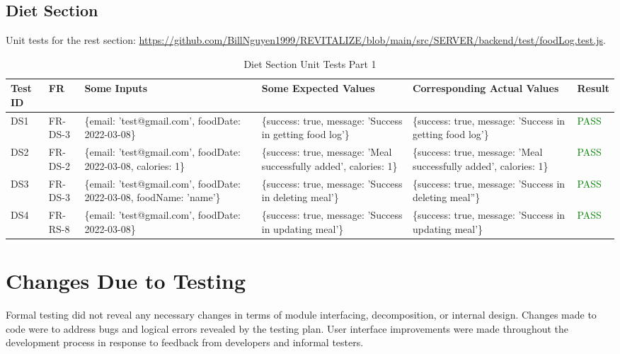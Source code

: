 \documentclass[12pt, titlepage]{article}
\begin{document}
\newpage

\subsection{Diet Section}

Unit tests for the rest section: \url{https://github.com/BillNguyen1999/REVITALIZE/blob/main/src/SERVER/backend/test/foodLog.test.js}.

\begin{table}[h]
\centering
\small
\begin{tabularx}{\textwidth}{|X|X|p{3cm}|p{2.5cm}|p{2.5cm}|X|}
	\hline
	Test ID & FR & Some Inputs & Some Expected Values & Corresponding Actual Values & Result \\
	\hline
	DS1 & FR-DS-3 & \{email: 'test@gmail.com', foodDate: 2022-03-08\}  & \{success: true, message: 'Success in getting food log'\} & \{success: true, message: 'Success in getting food log'\} & \textcolor{Green}{PASS} \\
	\hline
	DS2 & FR-DS-2 & \{email: 'test@gmail.com', foodDate: 2022-03-08, calories: 1\}  & \{success: true, message: 'Meal successfully added', calories: 1\} & \{success: true, message: 'Meal successfully added', calories: 1\} & \textcolor{Green}{PASS} \\
	\hline
	DS3 & FR-DS-3 & \{email: 'test@gmail.com', foodDate: 2022-03-08, foodName: 'name'\}  & \{success: true, message: 'Success in deleting meal'\} & \{success: true, message: 'Success in deleting meal''\} & \textcolor{Green}{PASS} \\
	\hline
	DS4 & FR-RS-8 & \{email: 'test@gmail.com', foodDate: 2022-03-08\}  & \{success: true, message: 'Success in updating meal'\} & \{success: true, message: 'Success in updating meal'\} & \textcolor{Green}{PASS} \\
	\hline
\end{tabularx}
\caption{Diet Section Unit Tests Part 1}
\label{table:diet-unit-tests}
\end{table}

\newpage

\section{Changes Due to Testing}
Formal testing did not reveal any necessary changes in terms of module interfacing, decomposition, or internal design. Changes made to code were to address bugs and logical errors revealed by the testing plan. User interface improvements were made throughout the development process in response to feedback from developers and informal testers.
\end{document}
